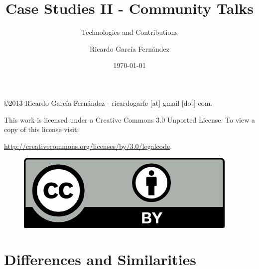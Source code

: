 \documentclass[11pt]{scrartcl}
\title{\textbf{Case Studies II - Community Talks}}
\subtitle{Technologies and Contributions}
\author{Ricardo Garc\'ia Fern\'andez}
\date{\today}
\begin{document}
\maketitle

\vfill

\begin{flushright}
    \copyright  2013 Ricardo Garc\'ia Fern\'andez - ricardogarfe [at] gmail [dot] com.

    This work is licensed under a Creative Commons 3.0 Unported License.
    To view a copy of this license visit:
 
    \url{http://creativecommons.org/licenses/by/3.0/legalcode}.
\end{flushright}

\begin{figure}[h]
    \begin{flushright}	
        \includegraphics{by}
        \label{fig:by}
    \end{flushright}
\end{figure}

\newpage

\tableofcontents

\newpage


















\section{Differences and Similarities}
\label{sec:differences-and-similarities}
\end{document}
